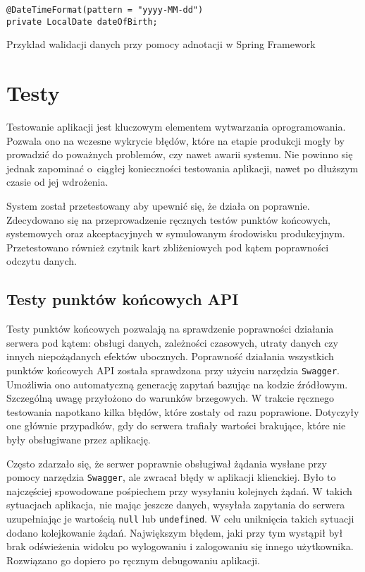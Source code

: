 \begin{listing}[H]
    \begin{verbatim}
@DateTimeFormat(pattern = "yyyy-MM-dd")
private LocalDate dateOfBirth;
\end{verbatim}
    \caption{Przykład walidacji danych przy pomocy adnotacji w Spring Framework}
    \label{lst:validation}
\end{listing}

\section{Testy}

Testowanie aplikacji jest kluczowym elementem wytwarzania oprogramowania. Pozwala ono na wczesne wykrycie błędów, które na etapie produkcji mogły by prowadzić do poważnych problemów, czy nawet awarii systemu. Nie powinno się jednak zapominać o~ciągłej konieczności testowania aplikacji, nawet po dłuższym czasie od jej wdrożenia.

System został przetestowany aby upewnić się, że działa on poprawnie. Zdecydowano się na przeprowadzenie ręcznych testów punktów końcowych, systemowych oraz akceptacyjnych w symulowanym środowisku produkcyjnym. Przetestowano również czytnik kart zbliżeniowych pod kątem poprawności odczytu danych.

\subsection{Testy punktów końcowych API}

Testy punktów końcowych pozwalają na sprawdzenie poprawności działania serwera pod kątem: obsługi danych, zależności czasowych, utraty danych czy innych niepożądanych efektów ubocznych. Poprawność działania wszystkich punktów końcowych API została sprawdzona przy użyciu narzędzia \texttt{Swagger}. Umożliwia ono automatyczną generację zapytań bazując na kodzie źródłowym. Szczególną uwagę przyłożono do warunków brzegowych. W trakcie ręcznego testowania napotkano kilka błędów, które zostały od razu poprawione. Dotyczyły one głównie przypadków, gdy do serwera trafiały wartości brakujące, które nie były obsługiwane przez aplikację.

Często zdarzało się, że serwer poprawnie obsługiwał żądania wysłane przy pomocy narzędzia \texttt{Swagger}, ale zwracał błędy w aplikacji klienckiej. Było to najczęściej spowodowane pośpiechem przy wysyłaniu kolejnych żądań. W takich sytuacjach aplikacja, nie mając jeszcze danych, wysyłała zapytania do serwera uzupełniając je wartością \texttt{null} lub \texttt{undefined}. W celu uniknięcia takich sytuacji dodano kolejkowanie żądań. Największym błędem, jaki przy tym wystąpił był brak odświeżenia widoku po wylogowaniu i zalogowaniu się innego użytkownika. Rozwiązano go dopiero po ręcznym debugowaniu aplikacji.

